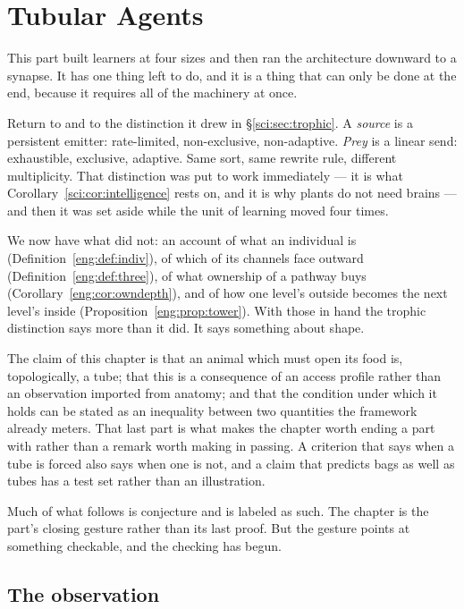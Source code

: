 \chapter{Tubular Agents}
\label{ch:tub}

This part built learners at four sizes and then ran the architecture downward to
a synapse. It has one thing left to do, and it is a thing that can only be done
at the end, because it requires all of the machinery at once.

Return to \chSci and to the distinction it drew in \S\ref{sci:sec:trophic}. A
\emph{source} is a persistent emitter: rate-limited, non-exclusive,
non-adaptive. \emph{Prey} is a linear send: exhaustible, exclusive, adaptive.
Same sort, same rewrite rule, different multiplicity. That distinction was put
to work immediately --- it is what Corollary~\ref{sci:cor:intelligence} rests on,
and it is why plants do not need brains --- and then it was set aside while the
unit of learning moved four times.

We now have what \chSci did not: an account of what an individual is
(Definition~\ref{eng:def:indiv}), of which of its channels face outward
(Definition~\ref{eng:def:three}), of what ownership of a pathway buys
(Corollary~\ref{eng:cor:owndepth}), and of how one level's outside becomes the
next level's inside (Proposition~\ref{eng:prop:tower}). With those in hand the
trophic distinction says more than it did. It says something about shape.

The claim of this chapter is that an animal which must open its food is,
topologically, a tube; that this is a consequence of an access profile rather
than an observation imported from anatomy; and that the condition under which it
holds can be stated as an inequality between two quantities the framework
already meters. That last part is what makes the chapter worth ending a part
with rather than a remark worth making in passing. A criterion that says when a
tube is forced also says when one is not, and a claim that predicts bags as well
as tubes has a test set rather than an illustration.

Much of what follows is conjecture and is labeled as such. The chapter is the
part's closing gesture rather than its last proof. But the gesture points at
something checkable, and the checking has begun.

\section{The observation}
\label{tub:sec:obs}

